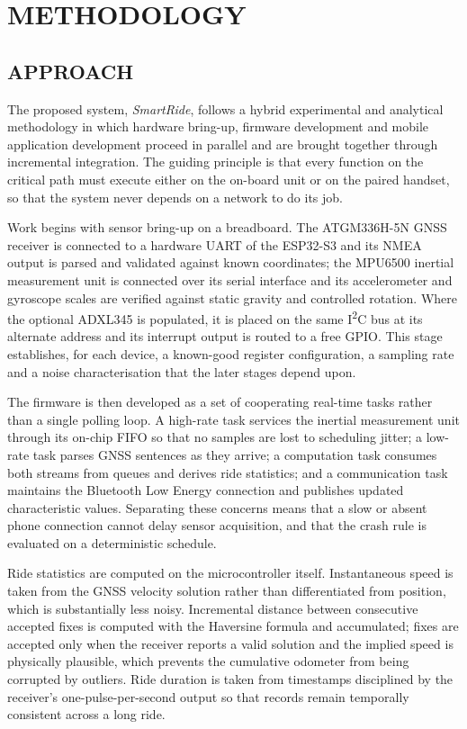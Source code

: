 \documentclass[12pt,a4paper,oneside]{report}
\begin{document}
\chapter{METHODOLOGY}

\section{APPROACH}

The proposed system, \textit{SmartRide}, follows a hybrid experimental and analytical
methodology in which hardware bring-up, firmware development and mobile application
development proceed in parallel and are brought together through incremental integration.
The guiding principle is that every function on the critical path must execute either on the
on-board unit or on the paired handset, so that the system never depends on a network to do
its job.

Work begins with sensor bring-up on a breadboard. The ATGM336H-5N GNSS receiver is connected
to a hardware UART of the ESP32-S3 and its NMEA output is parsed and validated against known
coordinates; the MPU6500 inertial measurement unit is connected over its serial interface and
its accelerometer and gyroscope scales are verified against static gravity and controlled
rotation. Where the optional ADXL345 is populated, it is placed on the same
I\textsuperscript{2}C bus at its alternate address and its interrupt output is routed to a
free GPIO. This stage establishes, for each device, a known-good register configuration, a
sampling rate and a noise characterisation that the later stages depend upon.

The firmware is then developed as a set of cooperating real-time tasks rather than a single
polling loop. A high-rate task services the inertial measurement unit through its on-chip
FIFO so that no samples are lost to scheduling jitter; a low-rate task parses GNSS sentences
as they arrive; a computation task consumes both streams from queues and derives ride
statistics; and a communication task maintains the Bluetooth Low Energy connection and
publishes updated characteristic values. Separating these concerns means that a slow or
absent phone connection cannot delay sensor acquisition, and that the crash rule is evaluated
on a deterministic schedule.

Ride statistics are computed on the microcontroller itself. Instantaneous speed is taken
from the GNSS velocity solution rather than differentiated from position, which is
substantially less noisy. Incremental distance between consecutive accepted fixes is
computed with the Haversine formula and accumulated; fixes are accepted only when the
receiver reports a valid solution and the implied speed is physically plausible, which
prevents the cumulative odometer from being corrupted by outliers. Ride duration is taken
from timestamps disciplined by the receiver's one-pulse-per-second output so that records
remain temporally consistent across a long ride.
\end{document}
